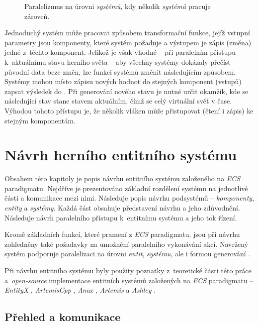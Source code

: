 \begin{figure}[H]
	\centering
	\caption{Paralelizmus na úrovni \emph{systémů}, kdy několik \emph{systémů} pracuje zároveň.}
	\label{Fig:PARSystem}
\end{figure}

Jednoduchý systém může pracovat způsobem transformační funkce, jejíž vstupní parametry jsou komponenty, které systém požaduje a výstupem je zápis (změna) jedné z~těchto komponent. Jelikož je však vhodné -- při paralelním přístupu k~aktuálnímu stavu herního světa -- aby všechny systémy dokázaly přečíst původní data beze změn, lze funkci systémů změnit následujícím způsobem. Systémy mohou místo zápisu nových hodnot do stejných komponent (vstupů) zapsat výsledek do  \cite{FrontierThreads}. Při generování nového stavu je nutné určit okamžik, kde se následující stav stane stavem aktuálním, čímž se celý virtuální svět  v čase. Výhodou tohoto přístupu je, že několik vláken může přistupovat (čtení i zápis) ke stejným komponentám.

\chapter{Návrh herního entitního systému}
\label{Chap:Design}

Obsahem této kapitoly je popis návrhu entitního systému založeného na \emph{ECS} paradigmatu. Nejdříve je prezentováno základní rozdělení systému na jednotlivé části a komunikace mezi nimi. Následuje popis návrhu podsystémů -- \emph{komponenty}, \emph{entity} a \emph{systémy}. Každá část obsahuje představení návrhu a jeho zdůvodnění. Následuje návrh paralelního přístupu k~entitnímu systému a jeho tok řízení.

Kromě základních funkcí, které pramení z \emph{ECS} paradigmatu, jsou při návrhu zohledněny také požadavky na umožnění paralelního vykonávání akcí. Navržený systém podporuje paralelizaci na úrovni \emph{entit}, \emph{systému}, ale i formou generování . 

Při návrhu entitního systému byly použity poznatky z~teoretické části této práce a~\emph{open-source} implementace entitních systémů založených na \emph{ECS} paradigmatu -- \emph{EntityX} \cite{EntityX}, \emph{ArtemisCpp} \cite{ArtemisCpp}, \emph{Anax} \cite{Anax}, \emph{Artemis} \cite{ArtemisJava} a \emph{Ashley} \cite{Ashley}.

\section{Přehled a komunikace}

